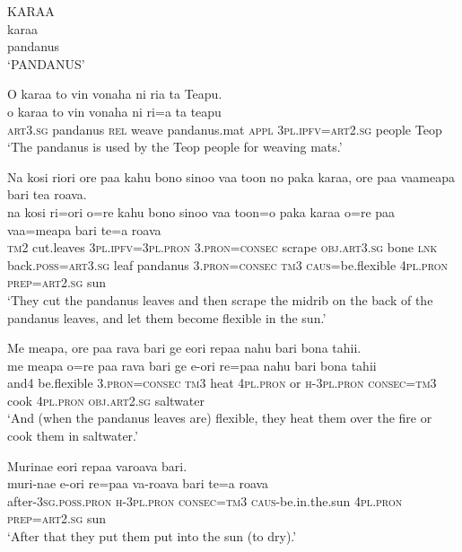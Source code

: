 \ea\label{ex:text9-1}
KARAA\\
\gll karaa\\
     pandanus\\
\glt `PANDANUS'
\z

\ea\label{ex:text9-2}
O karaa to vin vonaha ni ria ta Teapu.\\
\gll o	karaa	to	vin	vonaha	ni	ri=a	ta	teapu\\
     \textsc{art}3.\textsc{sg}	pandanus	\textsc{rel}	weave	pandanus.mat	\textsc{appl}	3\textsc{pl}.\textsc{ipfv}=\textsc{art}2.\textsc{sg}	people	Teop\\
\glt `The pandanus is used by the Teop people for weaving mats.'
\z

\ea\label{ex:text9-3}
Na kosi riori ore paa kahu bono sinoo vaa toon no paka karaa, ore paa vaameapa bari tea roava.\\
\gll na	kosi	ri=ori	o=re	kahu	bono	sinoo	vaa	toon=o	paka	karaa	o=re	{paa}	vaa=meapa	bari	te=a	roava\\
     \textsc{tm}2	cut.leaves	3\textsc{pl}.\textsc{ipfv}=3\textsc{pl}.\textsc{pron}	3.\textsc{pron}=\textsc{consec}	scrape	\textsc{obj}.\textsc{art}3.\textsc{sg}	bone	\textsc{lnk}	back.\textsc{poss}=\textsc{art}3.\textsc{sg}	leaf	pandanus	3.\textsc{pron}=\textsc{consec}	\textsc{tm}3	\textsc{caus}=be.flexible	4\textsc{pl}.\textsc{pron}	\textsc{prep}=\textsc{art}2.\textsc{sg}	sun\\
\glt `They cut the pandanus leaves and then scrape the midrib on the back of the pandanus leaves, and let them become flexible in the sun.'
\z

\ea\label{ex:text9-4}
Me meapa, ore paa rava bari ge eori repaa nahu bari bona tahii.\\
\gll me	meapa	o=re	paa	rava	bari	ge	e-ori	re=paa	nahu	bari	bona	tahii\\
     and4	be.flexible	3.\textsc{pron}=\textsc{consec}	\textsc{tm}3	heat	4\textsc{pl}.\textsc{pron}	or	\textsc{h}-3\textsc{pl}.\textsc{pron}	\textsc{consec}=\textsc{tm}3	cook	4\textsc{pl}.\textsc{pron}	\textsc{obj}.\textsc{art}2.\textsc{sg}	saltwater\\
\glt `And (when the pandanus leaves are) flexible, they heat them over the fire or cook them in saltwater.'
\z

\ea\label{ex:text9-5}
Murinae eori repaa varoava bari.\\
\gll muri-nae	e-ori	re=paa	va-roava	bari	te=a	roava\\
     after-3\textsc{sg}.\textsc{poss}.\textsc{pron}	\textsc{h}-3\textsc{pl}.\textsc{pron}	\textsc{consec}=\textsc{tm}3	\textsc{caus}-be.in.the.sun	4\textsc{pl}.\textsc{pron}	\textsc{prep}=\textsc{art}2.\textsc{sg}	sun\\
\glt `After that they put them put into the sun (to dry).'
\z

